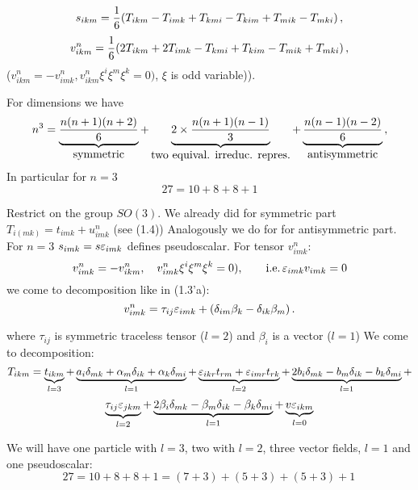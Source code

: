     $$
s_{ikm}={1\over 6}(T_{ikm}-T_{imk}+T_{kmi}-T_{kim}+T_{mik}-T_{mki})\,,
      $$
      $$
v^n_{ikm}={1\over 6}(2T_{ikm}+2T_{imk}-T_{kmi}+T_{kim}-T_{mik}+T_{mki})\,,
      $$
($v^n_{ikm}=-v^n_{imk},  v^n_{ikm}\xi^i\xi^m\xi^k=0)$,
$\xi$ is odd variable)).

     For dimensions we have
             $$
n^3=\underbrace{{n(n+1)(n+2)\over 6}}_{\hbox{symmetric}}+
              \underbrace{2\times {n(n+1)(n-1)\over 3}}_
        {\hbox {two equival. irreduc. repres.}}+
    \underbrace{{n(n-1)(n-2)\over 6}}_{\hbox{antisymmetric}}\,,
             $$
In particular for $n=3$    
     $$
   27=10+8+8+1
         $$

Restrict on the group $SO(3)$. We already did  for symmetric part
  $T_{i(mk)}=t_{imk}+u^n_{imk}$ (see (1.4))  Analogously we do for
for antisymmetric part. 
For $n=3$ $s_{imk}=s\varepsilon_{imk}$ defines pseudoscalar.
For tensor $v^n_{imk}$:
      $$
v^n_{imk}=-v^n_{ikm}, \quad v^n_{imk}\xi^i\xi^m\xi^k=0),\qquad {\rm i.e.}\,
\varepsilon_{imk}v_{imk}=0
     $$
we come to decomposition like in (1.3'a):
           $$
v^n_{imk}=\tau_{ij}\varepsilon_{imk}+(\delta_{im}\beta_k-\delta_{ik}\beta_m)\,.
           $$
            
where $\tau_{ij}$ is symmetric traceless tensor ($l=2$) and $\beta_i$
is a vector ($l=1$)
We come to decomposition:
  $$
        T_{ikm}=\underbrace {t_{ikm}}_{l=3}+
              \underbrace {a_i\delta_{mk}+
      \alpha_m\delta_{ik}+\alpha_k\delta_{mi}}_{l=1}+
\underbrace{\varepsilon_{ikr}t_{rm}+\varepsilon_{imr}t_{rk}}_{l=2}+
        \underbrace{2b_i\delta_{mk}-
      b_m\delta_{ik}-b_k\delta_{mi}}_{l=1}+
              $$
                 $$
        \underbrace{\tau_{ij}\varepsilon_{jkm}}_{l=2}+
        \underbrace{2\beta_i\delta_{mk}-
      \beta_m\delta_{ik}-\beta_k\delta_{mi}}_{l=1}+
     \underbrace{v\varepsilon_{ikm}}_{l=0}
                 $$

We will have one particle with $l=3$, two with $l=2$, three vector
fields, $l=1$
and one pseudoscalar: 
              $$
27=10+8+8+1=(7+3)+(5+3)+(5+3)+1\,
              $$

\bye

